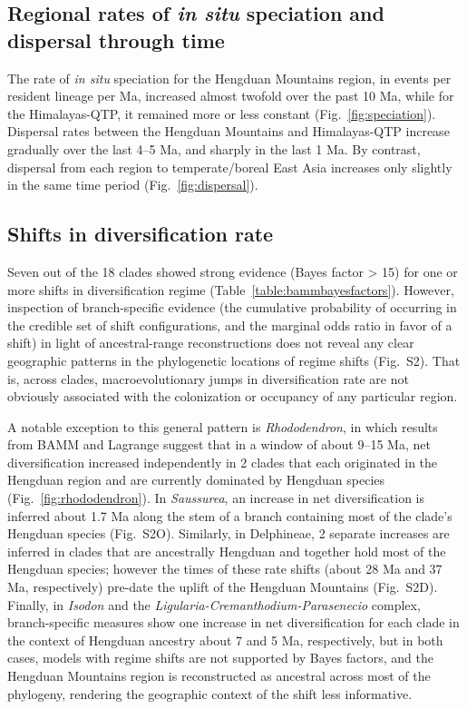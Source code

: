\subsection*{Regional rates of \textit{in situ} speciation and
  dispersal through time}

The rate of \textit{in situ} speciation for the Hengduan Mountains
region, in events per resident lineage per Ma, increased almost
twofold over the past 10 Ma, while for the Himalayas-QTP, it remained
more or less constant (Fig.~\ref{fig:speciation}). Dispersal rates
between the Hengduan Mountains and Himalayas-QTP increase gradually
over the last 4--5 Ma, and sharply in the last 1 Ma. By contrast,
dispersal from each region to temperate/boreal East Asia increases
only slightly in the same time period (Fig.~\ref{fig:dispersal}).

\subsection*{Shifts in diversification rate}

Seven out of the 18 clades showed strong evidence (Bayes factor > 15)
for one or more shifts in diversification regime
(Table~\ref{table:bammbayesfactors}). However, inspection of
branch-specific evidence (the cumulative probability of occurring in
the credible set of shift configurations, and the marginal odds ratio
in favor of a shift) in light of ancestral-range reconstructions does
not reveal any clear geographic patterns in the phylogenetic locations
of regime shifts (Fig.~S2). That is, across clades, macroevolutionary
jumps in diversification rate are not obviously associated with the
colonization or occupancy of any particular region.

A notable exception to this general pattern is \emph{Rhododendron}, in
which results from BAMM and Lagrange suggest that in a window of about
9--15 Ma, net diversification increased independently in 2 clades that
each originated in the Hengduan region and are currently dominated by
Hengduan species (Fig.~\ref{fig:rhododendron}). In \emph{Saussurea},
an increase in net diversification is inferred about 1.7 Ma along the
stem of a branch containing most of the clade's Hengduan species
(Fig.~S2O). Similarly, in Delphineae, 2 separate increases are
inferred in clades that are ancestrally Hengduan and together hold
most of the Hengduan species; however the times of these rate shifts
(about 28 Ma and 37 Ma, respectively) pre-date the uplift of the
Hengduan Mountains (Fig.~S2D). Finally, in \emph{Isodon} and the
\emph{Ligularia-Cremanthodium-Parasenecio} complex, branch-specific
measures show one increase in net diversification for each clade in
the context of Hengduan ancestry about 7 and 5 Ma, respectively, but
in both cases, models with regime shifts are not supported by Bayes
factors, and the Hengduan Mountains region is reconstructed as
ancestral across most of the phylogeny, rendering the geographic
context of the shift less informative.

